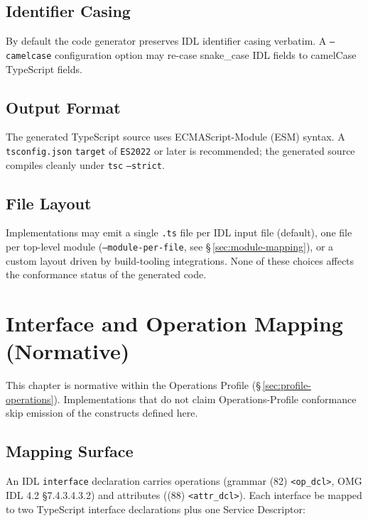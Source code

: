 \documentclass{../styles/zerodds-vendor-spec}
\begin{document}
\section{Identifier Casing}

By default the code generator preserves IDL identifier casing
verbatim. A \texttt{--camelcase} configuration option may re-case
snake\_case IDL fields to camelCase TypeScript fields.

\section{Output Format}

The generated TypeScript source uses ECMAScript-Module (ESM)
syntax. A \texttt{tsconfig.json} \texttt{target} of \texttt{ES2022}
or later is recommended; the generated source compiles cleanly
under \texttt{tsc} \texttt{--strict}.

\section{File Layout}

Implementations may emit a single \texttt{.ts} file per IDL input
file (default), one file per top-level module
(\texttt{--module-per-file}, see \S\,\ref{sec:module-mapping}), or
a custom layout driven by build-tooling integrations. None of these
choices affects the conformance status of the generated code.

\chapter{Interface and Operation Mapping (Normative)}\label{ch:operations}

This chapter is normative within the Operations Profile
(\S\,\ref{sec:profile-operations}). Implementations that do not
claim Operations-Profile conformance  skip emission of
the constructs defined here.

\section{Mapping Surface}

An IDL \texttt{interface} declaration carries operations
(grammar (82) \texttt{<op\_dcl>}, OMG IDL 4.2 §7.4.3.4.3.2) and
attributes ((88) \texttt{<attr\_dcl>}). Each interface
 be mapped to two TypeScript interface declarations
plus one Service Descriptor:
\end{document}
